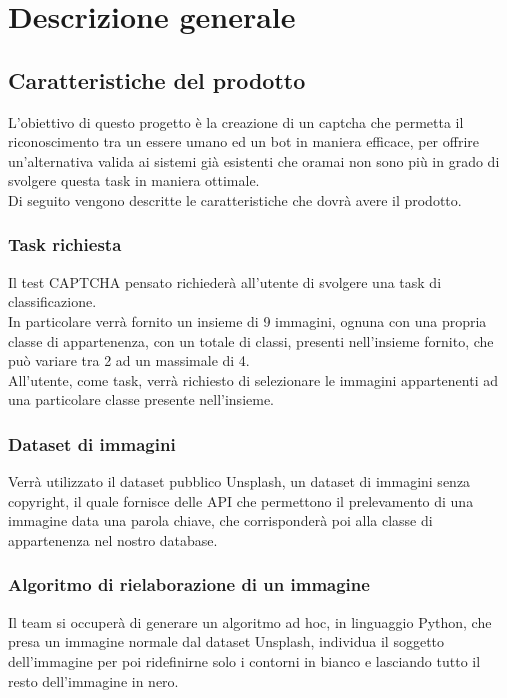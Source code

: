\section{Descrizione generale}

\subsection{Caratteristiche del prodotto}
L'obiettivo di questo progetto è la creazione di un captcha che permetta il riconoscimento tra un essere umano ed un bot in maniera efficace, per offrire un'alternativa valida ai sistemi già esistenti che oramai non sono più in grado di svolgere questa task in maniera ottimale.\\

Di seguito vengono descritte le caratteristiche che dovrà avere il prodotto.

\subsubsection{Task richiesta}
Il test CAPTCHA pensato richiederà all'utente di svolgere una task di classificazione.\\
In particolare verrà fornito un insieme di 9 immagini, ognuna con una propria classe di appartenenza, con un totale di classi, presenti nell'insieme fornito, che può variare tra 2 ad un massimale di 4.\\
All'utente, come task, verrà richiesto di selezionare le immagini appartenenti ad una particolare classe presente nell'insieme.

\subsubsection{Dataset di immagini}
Verrà utilizzato il dataset pubblico Unsplash, un dataset di immagini senza copyright, il quale fornisce delle API che permettono il prelevamento di una immagine data una parola chiave, che corrisponderà poi alla classe di appartenenza nel nostro database.

\subsubsection{Algoritmo di rielaborazione di un immagine}
Il team si occuperà di generare un algoritmo ad hoc, in linguaggio Python, che presa un immagine normale dal dataset Unsplash, individua il soggetto dell'immagine per poi ridefinirne solo i contorni in bianco e lasciando tutto il resto dell'immagine in nero.  

